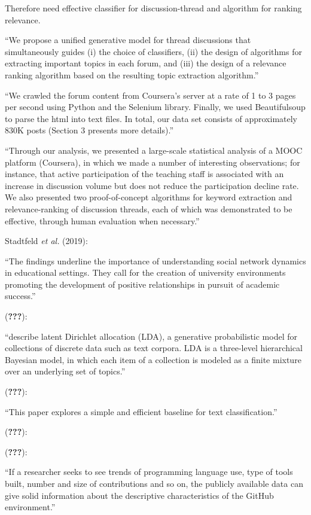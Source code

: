 \documentclass[11pt,preprint, authoryear]{article}
\numberwithin{equation}{section}
\numberwithin{figure}{section}
\numberwithin{table}{section}
\begin{document}
Therefore need effective classifier for discussion-thread and algorithm
for ranking relevance.

``We propose a unified generative model for thread discussions that
simultaneously guides (i) the choice of classifiers, (ii) the design of
algorithms for extracting important topics in each forum, and (iii) the
design of a relevance ranking algorithm based on the resulting topic
extraction algorithm.''

``We crawled the forum content from Coursera's server at a rate of 1 to
3 pages per second using Python and the Selenium library. Finally, we
used Beautifulsoup to parse the html into text files. In total, our data
set consists of approximately 830K posts (Section 3 presents more
details).''

``Through our analysis, we presented a large-scale statistical analysis
of a MOOC platform (Coursera), in which we made a number of interesting
observations; for instance, that active participation of the teaching
staff is associated with an increase in discussion volume but does not
reduce the participation decline rate. We also presented two
proof-of-concept algorithms for keyword extraction and relevance-ranking
of discussion threads, each of which was demonstrated to be effective,
through human evaluation when necessary.''

Stadtfeld \emph{et al.} (2019):

``The findings underline the importance of understanding social network
dynamics in educational settings. They call for the creation of
university environments promoting the development of positive
relationships in pursuit of academic success.''

({\textbf{???}}):

``describe latent Dirichlet allocation (LDA), a generative probabilistic
model for collections of discrete data such as text corpora. LDA is a
three-level hierarchical Bayesian model, in which each item of a
collection is modeled as a finite mixture over an underlying set of
topics.''

({\textbf{???}}):

``This paper explores a simple and efficient baseline for text
classification.''

({\textbf{???}}):

({\textbf{???}}):

``If a researcher seeks to see trends of programming language use, type
of tools built, number and size of contributions and so on, the publicly
available data can give solid information about the descriptive
characteristics of the GitHub environment.''
\end{document}
